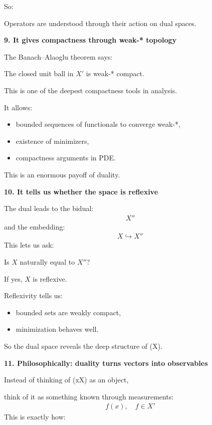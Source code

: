 \begin{description}
So:

\> Operators are understood through their action on dual spaces.

\item \textbf{9. It gives compactness through weak-* topology}

The Banach–Alaoglu theorem says:

\> The closed unit ball in $X'$ is weak-* compact.

This is one of the deepest compactness tools in analysis.

It allows:

	\begin{itemize}
    \item bounded sequences of functionals to converge weak-*,
    \item existence of minimizers,
    \item compactness arguments in PDE.
	\end{itemize}

This is an enormous payoff of duality.

\item \textbf{10. It tells us whether the space is reflexive}

The dual leads to the bidual:
\begin{align*}
X''
\end{align*}
and the embedding:
\begin{align*}
X\hookrightarrow X''
\end{align*}
This lets us ask:

\> Is $X$ naturally equal to $X''$?

If yes, $X$ is reflexive.

Reflexivity tells us:

	\begin{itemize}
    \item bounded sets are weakly compact,
    \item minimization behaves well.
	\end{itemize}

So the dual space reveals the deep structure of (X).

\item \textbf{11. Philosophically: duality turns vectors into observables}

Instead of thinking of (x\in X) as an object,

think of it as something known through measurements:
\begin{align*}
f(x),\quad f\in X'
\end{align*}
This is exactly how:


\end{description}
